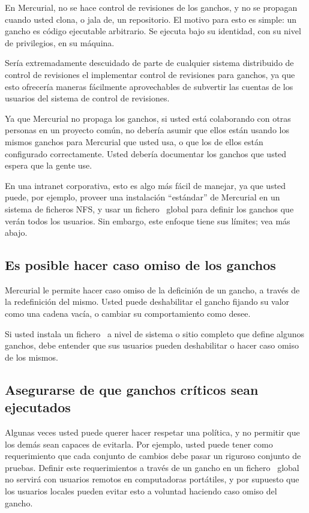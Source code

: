 En Mercurial, no se hace control de revisiones de los ganchos, y no se
propagan cuando usted clona, o jala de, un repositorio. El motivo para
esto es simple: un gancho es código ejecutable arbitrario. Se ejecuta
bajo su identidad, con su nivel de privilegios, en su máquina.

Sería extremadamente descuidado de parte de cualquier sistema
distribuido de control de revisiones el implementar control de
revisiones para ganchos, ya que esto ofrecería maneras fácilmente
aprovechables de subvertir las cuentas de los usuarios del sistema de
control de revisiones.

Ya que Mercurial no propaga los ganchos, si usted está colaborando con
otras personas en un proyecto común, no debería asumir que ellos están
usando los mismos ganchos para Mercurial que usted usa, o que los de
ellos están configurado correctamente. Usted debería documentar los
ganchos que usted espera que la gente use.

En una intranet corporativa, esto es algo más fácil de manejar, ya que
usted puede, por ejemplo, proveer una instalación ``estándar'' de
Mercurial en un sistema de ficheros NFS, y usar un fichero \hgrc\
global para definir los ganchos que verán todos los usuarios. Sin
embargo, este enfoque tiene sus límites; vea más abajo.

\subsection{Es posible hacer caso omiso de los ganchos}

Mercurial le permite hacer caso omiso de la deficinión de un gancho,
a través de la redefinición del mismo. Usted puede deshabilitar el
gancho fijando su valor como una cadena vacía, o cambiar su
comportamiento como desee.

Si usted instala un fichero \hgrc\ a nivel de sistema o sitio completo
que define algunos ganchos, debe entender que sus usuarios pueden
deshabilitar o hacer caso omiso de los mismos.

\subsection{Asegurarse de que ganchos críticos sean ejecutados}

Algunas veces usted puede querer hacer respetar una política, y no
permitir que los demás sean capaces de evitarla. Por ejemplo, usted
puede tener como requerimiento que cada conjunto de cambios debe pasar
un riguroso conjunto de pruebas. Definir este requerimientos a través
de un gancho en un fichero \hgrc\ global no servirá con usuarios
remotos en computadoras portátiles, y por supuesto que los usuarios
locales pueden evitar esto a voluntad haciendo caso omiso del gancho.

